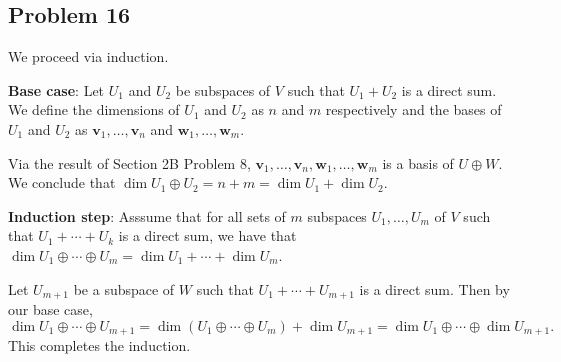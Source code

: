 \documentclass[11pt]{article}
\renewcommand{\vec}[1]{\mathbf{#1}}
\begin{document}

\subsection{Problem 16}

We proceed via induction.

\textbf{Base case}: Let $U_{1}$ and $U_{2}$ be subspaces of $V$ such that $U_{1} + U_{2}$ is a direct sum. We define the dimensions of $U_{1}$ and $U_{2}$ as $n$ and $m$ respectively and the bases of $U_{1}$ and $U_{2}$ as $\vec{v}_{1}, \ldots, \vec{v}_{n}$ and $\vec{w}_{1}, \ldots, \vec{w}_{m}$.

Via the result of Section 2B Problem 8, $\vec{v}_{1}, \ldots, \vec{v}_{n}, \vec{w}_{1}, \ldots, \vec{w}_{m}$ is a basis of $U \oplus W$. We conclude that $\dim U_{1} \oplus U_{2} = n + m = \dim U_{1} + \dim U_{2}$.

\textbf{Induction step}: Asssume that for all sets of $m$ subspaces $U_{1}, \ldots, U_{m}$ of $V$ such that $U_{1} + \cdots + U_{k}$ is a direct sum, we have that $\dim U_{1} \oplus \cdots \oplus U_{m} = \dim U_{1} + \cdots + \dim U_{m}$.

Let $U_{m + 1}$ be a subspace of $W$ such that $U_{1} + \cdots + U_{m + 1}$ is a direct sum. Then by our base case,
\[
	\dim U_{1} \oplus \cdots \oplus U_{m + 1} = \dim (U_{1} \oplus \cdots \oplus U_{m}) + \dim U_{m + 1} = \dim U_{1} \oplus \cdots \oplus \dim U_{m + 1}.
\]
This completes the induction.

\end{document}
